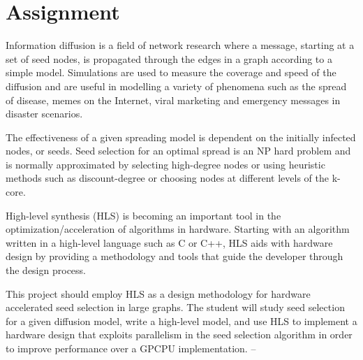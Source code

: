 \section{Assignment}
Information diffusion is a field of network research where a message, starting
at a set of seed nodes, is propagated through the edges in a graph according to
a simple model. Simulations are used to measure the coverage and speed of the
diffusion and are useful in modelling a variety of phenomena such as the spread
of disease, memes on the Internet, viral marketing and emergency messages in
disaster scenarios.

The effectiveness of a given spreading model is dependent on the initially
infected nodes, or seeds. Seed selection for an optimal spread is an NP hard
problem and is normally approximated by selecting high-degree nodes or using
heuristic methods such as discount-degree or choosing nodes at different levels
of the k-core.

High-level synthesis (HLS) is becoming an important tool in the
optimization/acceleration of algorithms in hardware. Starting with an algorithm
written in a high-level language such as C or C++, HLS aids with hardware
design by providing a methodology and tools that guide the developer through
the design process.

This project should employ HLS as a design methodology for hardware accelerated
seed selection in large graphs. The student will study seed selection for a
given diffusion model, write a high-level model, and use HLS to implement a
hardware design that exploits parallelism in the seed selection algorithm in
order to improve performance over a GPCPU implementation.
--
